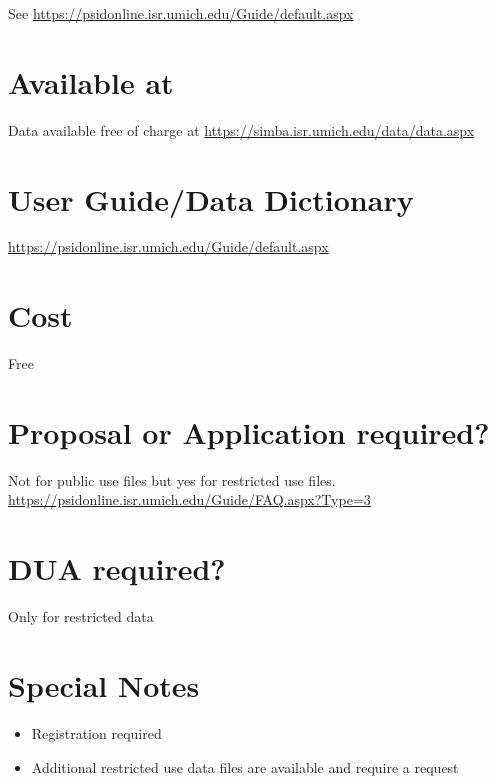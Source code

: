 \documentclass[
]{book}
\providecommand{\tightlist}{%
  \setlength{\itemsep}{0pt}\setlength{\parskip}{0pt}}
\begin{document}
See \url{https://psidonline.isr.umich.edu/Guide/default.aspx}

\hypertarget{available-at-72}{%
\section{Available at}\label{available-at-72}}

Data available free of charge at
\url{https://simba.isr.umich.edu/data/data.aspx}

\hypertarget{user-guidedata-dictionary-72}{%
\section{User Guide/Data Dictionary}\label{user-guidedata-dictionary-72}}

\url{https://psidonline.isr.umich.edu/Guide/default.aspx}

\hypertarget{cost-72}{%
\section{Cost}\label{cost-72}}

Free

\hypertarget{proposal-or-application-required-72}{%
\section{Proposal or Application required?}\label{proposal-or-application-required-72}}

Not for public use files but yes for restricted use files.
\url{https://psidonline.isr.umich.edu/Guide/FAQ.aspx?Type=3}

\hypertarget{dua-required-72}{%
\section{DUA required?}\label{dua-required-72}}

Only for restricted data

\hypertarget{special-notes-72}{%
\section{Special Notes}\label{special-notes-72}}

\begin{itemize}
\tightlist
\item
  Registration required
\item
  Additional restricted use data files are available and require a request
\end{itemize}
\end{document}
